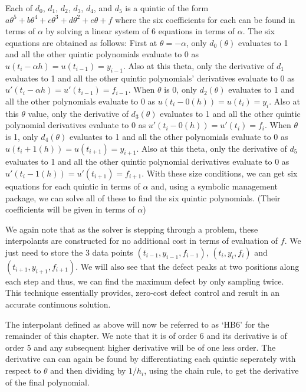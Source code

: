 \documentclass{article}
\begin{document}
Each of $d_0$, $d_1$, $d_2$, $d_3$, $d_4$, and $d_5$ is a quintic of the form $a\theta^5 + b\theta^4 + c\theta^3 + d\theta^2 + e\theta + f$ where the six coefficients for each can be found in terms of $\alpha$ by solving a linear system of 6 equations in terms of $\alpha$. The six equations are obtained as follows: First at $\theta = -\alpha$, only $d_0(\theta)$ evaluates to 1 and all the other quintic polynomials evaluate to 0 as $u(t_i - \alpha h) = u(t_{i - 1}) = y_{i - 1}$. Also at this theta, only the derivative of $d_1$ evaluates to 1 and all the other quintic polynomials' derivatives evaluate to 0 as $u'(t_i - \alpha h) = u'(t_{i - 1}) = f_{i - 1}$. When $\theta$ is 0, only $d_2(\theta)$ evaluates to 1 and all the other polynomials evaluate to 0 as $u(t_i - 0(h)) = u(t_i) = y_i$. Also at this $\theta$ value, only the derivative of $d_3(\theta)$ evaluates to 1 and all the other quintic polynomial derivatives evaluate to 0 as $u'(t_i - 0(h)) = u'(t_i) = f_i$. When $\theta$ is 1, only $d_4(\theta)$ evaluates to 1 and all the other polynomials evaluate to 0 as $u(t_i + 1(h)) = u(t_{i+1}) = y_{i+1}$. Also at this theta, only the derivative of $d_5$ evaluates to 1 and all the other quintic polynomial derivatives evaluate to 0 as $u'(t_i - 1(h)) = u'(t_{i+1}) = f_{i+1}$. With these size conditions, we can get six equations for each quintic in terms of $\alpha$ and, using a symbolic management package, we can solve all of these to find the six quintic polynomials. (Their coefficients will be given in terms of $\alpha$)

We again note that as the solver is stepping through a problem, these interpolants are constructed for no additional cost in terms of evaluation of $f$. We just need to store the 3 data points $(t_{i-1}, y_{i - 1}, f_{i - 1})$, $(t_i, y_i, f_i)$ and $(t_{i + 1}, y_{i + 1}, f_{i + 1})$. We will also see that the defect peaks at two positions along each step and thus, we can find the maximum defect by only sampling twice. This technique essentially provides, zero-cost defect control and result in an accurate continuous solution.

The interpolant defined as above will now be referred to as `HB6' for the remainder of this chapter. We note that it is of order 6 and its derivative is of order 5 and any subsequent higher derivative will be of one less order. The derivative can can again be found by differentiating each quintic seperately with respect to $\theta$ and then dividing by $1/h_i$, using the chain rule, to get the derivative of the final polynomial.
\end{document}
